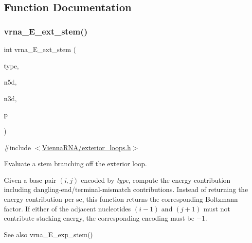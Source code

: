 \subsection{Function Documentation}
\mbox{\label{group__loops_gaa0c313c90da11aa741dcd62746d85337}} 
\subsubsection{\texorpdfstring{vrna\+\_\+\+E\+\_\+ext\+\_\+stem()}{vrna\_E\_ext\_stem()}}
{\footnotesize\ttfamily int vrna\+\_\+\+E\+\_\+ext\+\_\+stem (\begin{DoxyParamCaption}\item[{unsigned int}]{type,  }\item[{int}]{n5d,  }\item[{int}]{n3d,  }\item[{\mbox{\hyperlink{group__energy__parameters_ga8a69ca7d787e4fd6079914f5343a1f35}{vrna\+\_\+param\+\_\+t}} $\ast$}]{p }\end{DoxyParamCaption})}



{\ttfamily \#include $<$\mbox{\hyperlink{exterior__loops_8h}{Vienna\+R\+N\+A/exterior\+\_\+loops.\+h}}$>$}



Evaluate a stem branching off the exterior loop. 

Given a base pair $(i,j)$ encoded by {\itshape type}, compute the energy contribution including dangling-\/end/terminal-\/mismatch contributions. Instead of returning the energy contribution per-\/se, this function returns the corresponding Boltzmann factor. If either of the adjacent nucleotides $(i - 1)$ and $(j+1)$ must not contribute stacking energy, the corresponding encoding must be $-1$.

\begin{DoxySeeAlso}{See also}
vrna\+\_\+\+E\+\_\+exp\+\_\+stem()
\end{DoxySeeAlso}

